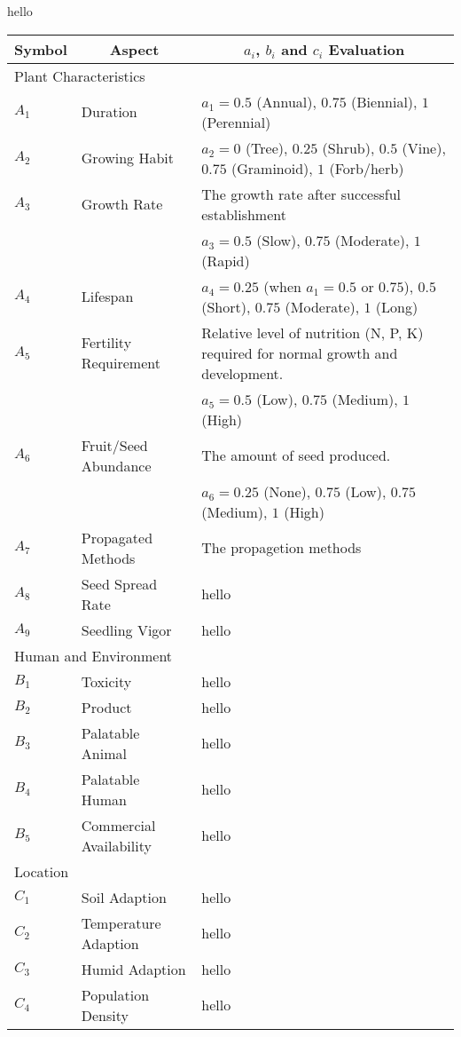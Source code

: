 \documentclass[12pt]{article}
\begin{document}
	hello
	
	{
	\fontsize{10}{13}\selectfont
	{
	\begin{longtable}{p{0.5in}p{1.7in}p{3.8in}}
	
	\toprule
	\multicolumn{1}{c}{\textbf{Symbol}} 
		& \multicolumn{1}{c}{\textbf{Aspect}}
		& \multicolumn{1}{c}{\textbf{$a_i$, $b_i$ and $c_i$ Evaluation}} \\

	\toprule
	\multicolumn{3}{l}{Plant Characteristics}\\
	\midrule
	
	$A_1$ & Duration & $a_1=0.5$ (Annual), $0.75$ (Biennial), $1$ (Perennial)\\
	$A_2$ & Growing Habit & $a_2=0$ (Tree), $0.25$ (Shrub), $0.5$ (Vine), $0.75$ (Graminoid), $1$ (Forb/herb)\\ 
	$A_3$ & Growth Rate & The growth rate after successful establishment\\
		& & $a_3=0.5$ (Slow), $0.75$ (Moderate), $1$ (Rapid)\\
	$A_4$ & Lifespan & $a_4=0.25$ (when $a_1=0.5$ or $0.75$), $0.5$ (Short), $0.75$ (Moderate), $1$ (Long) \\
	$A_5$ & Fertility Requirement & Relative level of nutrition (N, P, K) required for normal growth and development.\\
		 & & $a_5=0.5$ (Low), $0.75$ (Medium), $1$ (High)\\
	$A_6$ & Fruit/Seed Abundance & The amount of seed produced.\\
		& & $a_6=0.25$ (None), $0.75$ (Low), $0.75$ (Medium), $1$ (High)\\
	$A_7$ & Propagated Methods & The propagetion methods  \\
	$A_8$ & Seed Spread Rate & hello \\
	$A_9$ & Seedling Vigor & hello \\
	
	\midrule
	\multicolumn{3}{l}{Human and Environment}  \\
	\midrule
	
	$B_1$ & Toxicity & hello \\
	$B_2$ & Product & hello \\
	$B_3$ & Palatable Animal & hello \\
	$B_4$ & Palatable Human & hello \\
	$B_5$ & Commercial Availability & hello \\

	\midrule
	\multicolumn{3}{l}{Location}  \\
	\midrule
	
	$C_1$ & Soil Adaption & hello \\
	$C_2$ & Temperature Adaption & hello \\
	$C_3$ & Humid Adaption & hello \\
	$C_4$ & Population Density  & hello \\

	\bottomrule
	
	\end{longtable}
	}
	}
\end{document}

